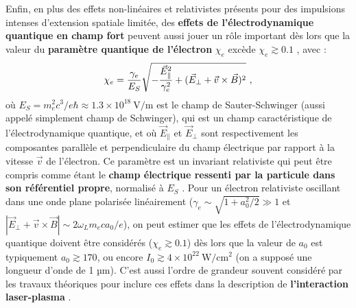 \begin{refsection}
Enfin, en plus des effets non-linéaires et relativistes présents pour des impulsions intenses d'extension spatiale limitée, des \textbf{effets de l'électrodynamique quantique en champ fort} peuvent aussi jouer un rôle important dès lors que la valeur du \textbf{paramètre quantique de l'électron} $\chi_e$ excède $\chi_e \gtrsim 0.1$ \parencite{zhang_2020}, avec \parencite{martinez_phd} :
\begin{equation}
    \chi_e = \dfrac{\gamma_e}{E_S} \sqrt{-\dfrac{\vec{E}_\parallel^2}{\gamma_e^2}+(\vec{E}_\perp + \vec{v} \times \vec{B})^2} ~ \rm ,
    \label{eq:2-chie_definition}
\end{equation}
où $E_S=m_e^2 c^3/e \hbar \approx 1.3 \times 10^{18} ~ \si{\V\per\m}$ est le champ de Sauter-Schwinger (aussi appelé simplement champ de Schwinger), qui est un champ caractéristique de l'électrodynamique quantique, et où $\vec{E}_\parallel$ et $\vec{E}_\perp$ sont respectivement les composantes parallèle et perpendiculaire du champ électrique par rapport à la vitesse $\vec{v}$ de l'électron. Ce paramètre est un invariant relativiste qui peut être compris comme étant le \textbf{champ électrique ressenti par la particule dans son référentiel propre}, normalisé à $E_S$ \parencite{dipiazza_2012}. Pour un électron relativiste oscillant dans une onde plane polarisée linéairement ($\gamma_e \sim \sqrt{1+a_0^2/2} \gg 1$ et $|\vec{E}_\perp+\vec{v} \times \vec{B}| \sim 2 \omega_L m_e c a_0/e$), on peut estimer que les effets de l'électrodynamique quantique doivent être considérés ($\chi_e \gtrsim 0.1$) dès lors que la valeur de $a_0$ est typiquement $a_0 \gtrsim 170$, ou encore $I_0 \gtrsim 4 \times 10^{22} ~ \si{\W \per \cm^2}$ (on a supposé une longueur d'onde de 1 µm). C'est aussi l'ordre de grandeur souvent considéré par les travaux théoriques pour inclure ces effets dans la description de \textbf{l'interaction laser-plasma} \parencite{dipiazza_2012, zhang_2020, capdessus_phd, martinez_phd}. 


\end{refsection}
